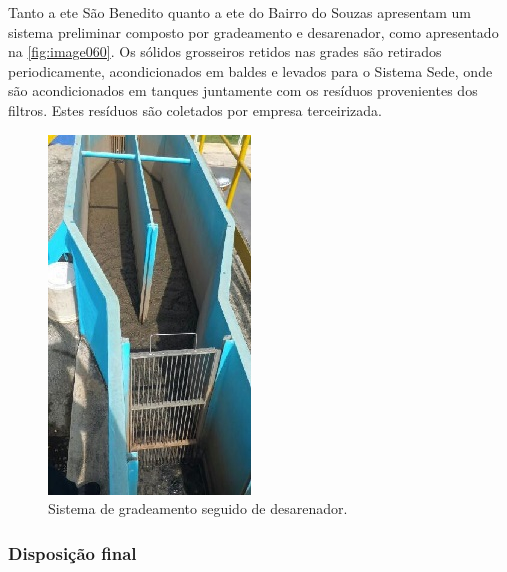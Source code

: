 	
	Tanto a \gls{ete} São Benedito quanto a \gls{ete} do Bairro do Souzas apresentam um sistema preliminar composto por gradeamento e desarenador, como apresentado na \autoref{fig:image060}. Os sólidos grosseiros retidos nas grades são retirados periodicamente, acondicionados em baldes e levados para o Sistema Sede, onde são acondicionados em tanques juntamente com os resíduos provenientes dos filtros. Estes resíduos são coletados por empresa terceirizada.
	
	\begin{figure}
		\centering
		\includegraphics[width=0.75\linewidth]{produtos/prodtres/image060}
		\caption{Sistema de gradeamento seguido de desarenador.}
		\label{fig:image060}
	\end{figure}
	
	
	\subsubsection{Disposição final}
	
